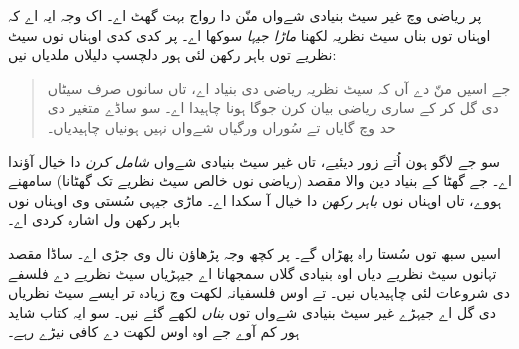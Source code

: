 \documentclass[../../../include/open-logic-section]{subfiles}
\begin{document}
پر ریاضی وچ غیر سیٹ بنیادی شےواں منّن دا رواج بہت گھٹ اے۔ اک وجہ ایہ
اے کہ اوہناں توں بناں سیٹ نظریہ لکھنا \emph{ماڑا جیہا} سوکھا اے۔
پر کدی کدی اوہناں نوں سیٹ نظریے توں باہر رکھن لئی ہور دلچسپ دلیلاں ملدیاں نیں:
\begin{quote}
	جے اسیں منّ دے آں کہ سیٹ نظریہ ریاضی دی بنیاد اے، تاں سانوں صرف سیٹاں
	دی گل کر کے ساری ریاضی بیان کرن جوگا ہونا چاہیدا اے۔ سو ساڈے متغیر دی
	حد وچ گایاں تے سُوراں ورگیاں شےواں نہیں ہونیاں چاہیدیاں۔
	\citep[p.~8]{Kunen1980}
\end{quote}
سو جے لاگو ہون اُتے زور دیئیے، تاں غیر سیٹ بنیادی شےواں \emph{شامل کرن}
دا خیال آؤندا اے۔ جے گھٹا کے بنیاد دین والا مقصد (ریاضی نوں خالص سیٹ
نظریے تک گھٹانا) سامھنے ہووے، تاں اوہناں نوں \emph{باہر رکھن} دا خیال آ
سکدا اے۔ ماڑی جیہی سُستی وی اوہناں نوں باہر رکھن ول اشارہ کردی اے۔

اسیں سبھ توں سُستا راہ پھڑاں گے۔ پر کچھ وجہ پڑھاؤن نال وی جڑی اے۔
ساڈا مقصد تہانوں سیٹ نظریے دیاں اوہ بنیادی گلاں سمجھانا اے جیہڑیاں سیٹ
نظریے دے فلسفے دی شروعات لئی چاہیدیاں نیں۔ تے اوس فلسفیانہ لکھت وچ زیادہ تر
ایسے سیٹ نظریاں دی گل اے جیہڑے غیر سیٹ بنیادی شےواں توں \emph{بناں} لکھے
گئے نیں۔ سو ایہ کتاب شاید ہور کم آوے جے اوہ اوس لکھت دے کافی نیڑے رہے۔
\end{document}
